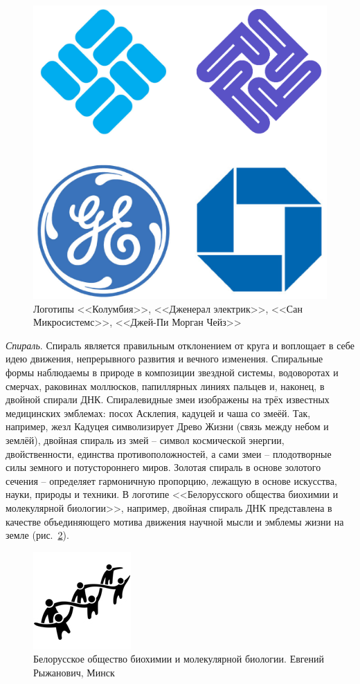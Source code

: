   \begin{figure}[h!]
  \centering
  \includegraphics[width=.3\linewidth]{images/swastica}
  \caption{Логотипы <<Колумбия>>, <<Дженерал электрик>>, <<Сан Микросистемс>>, <<Джей-Пи Морган Чейз>>}
  \label{fig:swastica}
\end{figure}

\emph{Спираль}. Спираль является правильным отклонением от круга и воплощает
  в себе идею движения, непрерывного развития и вечного изменения. Спиральные
  формы наблюдаемы в природе в композиции звездной системы, водоворотах и
  смерчах, раковинах моллюсков, папиллярных линиях пальцев и, наконец, в
  двойной спирали ДНК. Спиралевидные змеи изображены на трёх известных
  медицинских эмблемах: посох Асклепия, кадуцей и чаша со змеёй. Так,
  например, жезл Кадуцея символизирует Древо Жизни (связь между небом и землёй),
  двойная спираль из змей -- символ космической энергии, двойственности,
  единства противоположностей, а сами змеи -- плодотворные силы земного и
  потустороннего миров. Золотая спираль в основе золотого сечения -- определяет
  гармоничную пропорцию, лежащую в основе искусства, науки, природы и
  техники. В логотипе <<Белорусского общества биохимии и молекулярной биологии>>,
  например, двойная спираль ДНК представлена в качестве объединяющего мотива
  движения научной мысли и эмблемы жизни на земле (рис.~\ref{fig:biochem}).
  
\begin{figure}[h!]
  \centering
  \includegraphics[width=.3\linewidth]{images/biochem}
  \caption{Белорусское общество биохимии и молекулярной биологии. Евгений Рыжанович, Минск}
  \label{fig:biochem}
\end{figure}

